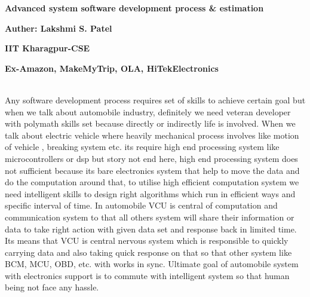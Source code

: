 \documentclass[11pt]{article}            %
\begin{document}
%
%
%
\centerline{\large{\bf
{ Advanced system software development process \& estimation }}}  

\medskip
% 
\centerline{\bf Auther:  Lakshmi S. Patel}
\centerline{\bf IIT Kharagpur-CSE}
\centerline{\bf Ex-Amazon, MakeMyTrip, OLA, HiTekElectronics}
\bigskip

\smallskip\\
Any software development process requires set of skills to achieve certain goal but when we talk about automobile industry, definitely we need veteran developer with polymath skills set because directly or indirectly life is involved. 
When we talk about electric vehicle where heavily mechanical process involves like motion of vehicle , breaking system etc. its require high end processing system like microcontrollers or dsp but story not end here, high end processing system 
does not sufficient because its bare electronics system that help to move the data and do the computation around that, to utilise high efficient computation system we need intelligent skills to design right algorithms which run in efficient ways and 
specific interval of time. In automobile VCU is central of computation and communication system to that all others system will share their information or data to take right action with given data set and response back in limited time. Its means that 
VCU is central nervous system which is responsible to quickly carrying data and also taking quick response on that so that other system like BCM, MCU, OBD, etc. with works in sync. Ultimate goal of automobile system with electronics support is 
to commute with intelligent system so that human being not face any hassle. 


\end{document}

